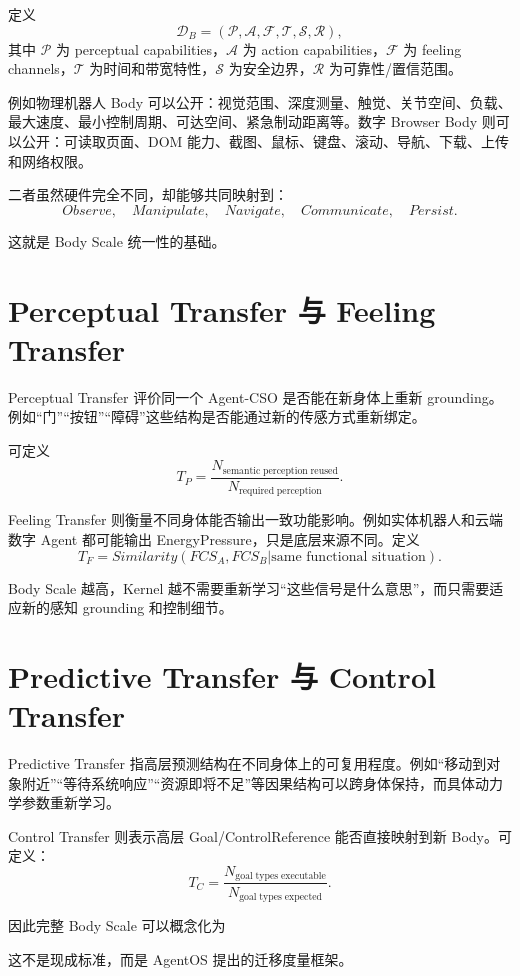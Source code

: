 定义
\[
\mathcal D_B
=
(
\mathcal P,
\mathcal A,
\mathcal F,
\mathcal T,
\mathcal S,
\mathcal R
),
\]
其中 $\mathcal P$ 为 perceptual capabilities，$\mathcal A$ 为 action capabilities，$\mathcal F$ 为 feeling channels，$\mathcal T$ 为时间和带宽特性，$\mathcal S$ 为安全边界，$\mathcal R$ 为可靠性/置信范围。

例如物理机器人 Body 可以公开：视觉范围、深度测量、触觉、关节空间、负载、最大速度、最小控制周期、可达空间、紧急制动距离等。数字 Browser Body 则可以公开：可读取页面、DOM 能力、截图、鼠标、键盘、滚动、导航、下载、上传和网络权限。

二者虽然硬件完全不同，却能够共同映射到：
\[
Observe,\quad
Manipulate,\quad
Navigate,\quad
Communicate,\quad
Persist.
\]

这就是 Body Scale 统一性的基础。

\section{Perceptual Transfer 与 Feeling Transfer}

Perceptual Transfer 评价同一个 Agent-CSO 是否能在新身体上重新 grounding。例如“门”“按钮”“障碍”这些结构是否能通过新的传感方式重新绑定。

可定义
\[
T_P
=
\frac{
N_{\mathrm{semantic\;perception\;reused}}
}{
N_{\mathrm{required\;perception}}
}.
\]

Feeling Transfer 则衡量不同身体能否输出一致功能影响。例如实体机器人和云端数字 Agent 都可能输出 EnergyPressure，只是底层来源不同。定义
\[
T_F
=
Similarity(
FCS_A,
FCS_B
|\text{same functional situation}
).
\]

Body Scale 越高，Kernel 越不需要重新学习“这些信号是什么意思”，而只需要适应新的感知 grounding 和控制细节。

\section{Predictive Transfer 与 Control Transfer}

Predictive Transfer 指高层预测结构在不同身体上的可复用程度。例如“移动到对象附近”“等待系统响应”“资源即将不足”等因果结构可以跨身体保持，而具体动力学参数重新学习。

Control Transfer 则表示高层 Goal/ControlReference 能否直接映射到新 Body。可定义：
\[
T_C
=
\frac{
N_{\mathrm{goal\;types\;executable}}
}{
N_{\mathrm{goal\;types\;expected}}
}.
\]

因此完整 Body Scale 可以概念化为
\begin{statementbox}
\centering
{}
\end{statementbox}
这不是现成标准，而是 AgentOS 提出的迁移度量框架。

